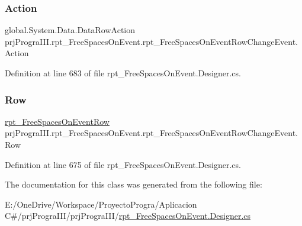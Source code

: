 \subsubsection{\texorpdfstring{Action}{Action}}
{\footnotesize\ttfamily global.\+System.\+Data.\+Data\+Row\+Action prj\+Progra\+I\+I\+I.\+rpt\+\_\+\+Free\+Spaces\+On\+Event.\+rpt\+\_\+\+Free\+Spaces\+On\+Event\+Row\+Change\+Event.\+Action\hspace{0.3cm}{\ttfamily [get]}}



Definition at line 683 of file rpt\+\_\+\+Free\+Spaces\+On\+Event.\+Designer.\+cs.

\hypertarget{classprj_progra_i_i_i_1_1rpt___free_spaces_on_event_1_1rpt___free_spaces_on_event_row_change_event_a87484af61de160691763d5e1d9d4b267}{}\label{classprj_progra_i_i_i_1_1rpt___free_spaces_on_event_1_1rpt___free_spaces_on_event_row_change_event_a87484af61de160691763d5e1d9d4b267} 
\subsubsection{\texorpdfstring{Row}{Row}}
{\footnotesize\ttfamily \hyperlink{classprj_progra_i_i_i_1_1rpt___free_spaces_on_event_1_1rpt___free_spaces_on_event_row}{rpt\+\_\+\+Free\+Spaces\+On\+Event\+Row} prj\+Progra\+I\+I\+I.\+rpt\+\_\+\+Free\+Spaces\+On\+Event.\+rpt\+\_\+\+Free\+Spaces\+On\+Event\+Row\+Change\+Event.\+Row\hspace{0.3cm}{\ttfamily [get]}}



Definition at line 675 of file rpt\+\_\+\+Free\+Spaces\+On\+Event.\+Designer.\+cs.



The documentation for this class was generated from the following file\+:\begin{DoxyCompactItemize}
\item 
E\+:/\+One\+Drive/\+Workspace/\+Proyecto\+Progra/\+Aplicacion C\#/prj\+Progra\+I\+I\+I/prj\+Progra\+I\+I\+I/\hyperlink{rpt___free_spaces_on_event_8_designer_8cs}{rpt\+\_\+\+Free\+Spaces\+On\+Event.\+Designer.\+cs}\end{DoxyCompactItemize}
